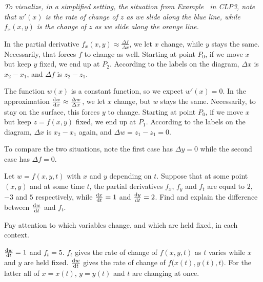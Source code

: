 \begin{solution}
	
\textit{To visualize, in a simplified setting, the situation from Example~ in CLP3, note that $w'(x)$ is the rate of change of $z$ as we slide along the blue line, while $f_x(x,y)$ is the change of $z$ as we slide along the orange line.}

In the partial derivative $f_x(x,y)\approx \frac{\Delta f}{\Delta x}$, we let $x$ change, while $y$ stays the same. Necessarily, that forces $f$ to change as well. Starting at point $P_0$, if we move $x$ but keep $y$ fixed, we end up at $P_2$. According to the labels on the diagram, $\Delta x$ is $x_2-x_1$, and $\Delta f$ is $z_2-z_1$.


The function $w(x)$ is a constant function, so we expect $w'(x)=0$.
In the approximation $\diff{w}{x}\approx \frac{\Delta w}{\Delta x}$, we let $x$ change, but $w$ stays the same. Necessarily, to stay on the surface, this
forces $y$ to change. Starting at point $P_0$, if we move $x$ but keep 
$z=f(x,y)$ fixed, we end up at $P_1$. According to the labels on the diagram, $\Delta x$ is $x_2-x_1$ again, and $\Delta w=z_1-z_1=0$.

To compare the two situations, note the first case has $\Delta y =0$ while 
the second case has $\Delta f =0$.
\end{solution}
\begin{question}[M200 2000D] %
Let $w=f(x,y,t)$ with $x$ and $y$ depending on $t$. Suppose
that at some point $(x,y)$ and at some time $t$, the partial derivatives
$f_x$, $f_y$ and $f_t$ are equal to $2$, $-3$ and $5$ respectively, while
$\diff{x}{t}=1$ and $\diff{y}{t}=2$. Find and explain the difference
between $\diff{w}{t}$ and $f_t$.
\end{question}

\begin{hint}
Pay attention to which variables change, and which are held fixed, in each context.
\end{hint}

\begin{answer}
$\diff{w}{t}=1$ and $f_t=5$. 
$f_t$ gives the rate of change of $f(x,y,t)$ as $t$ varies 
while $x$ and $y$ are held fixed. 
$\diff{w}{t}$ gives the rate of change of $f\big(x(t),y(t),t\big)$.
For the latter all of $x=x(t)$, $y=y(t)$ and $t$ are 
changing at once.
\end{answer}

